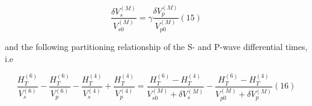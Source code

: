 \documentclass[11pt]{article}
\begin{document}
    \[
\frac{\delta V_{s}^{(M)}}{V_{s0}^{(M)}}  = \gamma  \frac{\delta V_{p}^{(M)}}{V_{p0}^{(M)}} (15)
\]

    and the following partitioning relationship of the S- and P-wave
differential times, i.e

    \[
\frac{H_{T}^{(6)}}{V_{s}^{(6)}} - \frac{H_{T}^{(6)}}{V_{p}^{(6)}} - \frac{H_{T}^{(4)}}{V_{s}^{(4)}} + \frac{H_{T}^{(4)}}{V_{p}^{(4)}} = \frac{H_{T}^{(6)} - H_{T}^{(4)}}{V_{s0}^{(M)} + \delta V_{s}^{(M)}} - \frac{H_{T}^{(6)} - H_{T}^{(4)}}{V_{p0}^{(M)} + \delta V_{p}^{(M)}} (16)
\]


    
    
    
    
\end{document}
